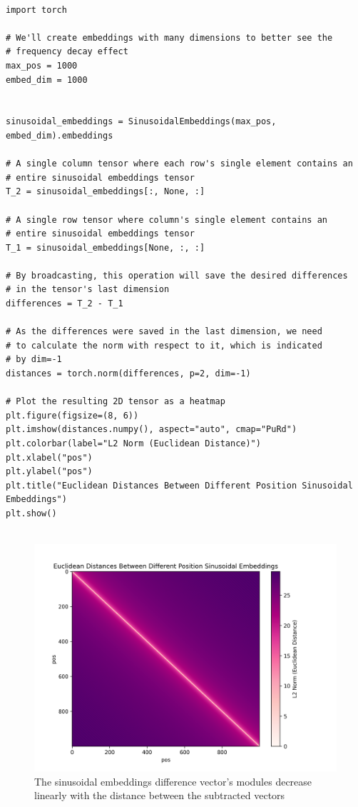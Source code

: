 \documentclass{article}
\begin{document}
\begin{lstlisting}[caption={Generating the plot of the module of the difference between every two different positions sinusoidal embeddings}]
	
import torch

# We'll create embeddings with many dimensions to better see the 
# frequency decay effect
max_pos = 1000
embed_dim = 1000


sinusoidal_embeddings = SinusoidalEmbeddings(max_pos, embed_dim).embeddings

# A single column tensor where each row's single element contains an 
# entire sinusoidal embeddings tensor
T_2 = sinusoidal_embeddings[:, None, :]

# A single row tensor where column's single element contains an 
# entire sinusoidal embeddings tensor
T_1 = sinusoidal_embeddings[None, :, :]

# By broadcasting, this operation will save the desired differences
# in the tensor's last dimension
differences = T_2 - T_1

# As the differences were saved in the last dimension, we need 
# to calculate the norm with respect to it, which is indicated 
# by dim=-1
distances = torch.norm(differences, p=2, dim=-1)

# Plot the resulting 2D tensor as a heatmap
plt.figure(figsize=(8, 6))
plt.imshow(distances.numpy(), aspect="auto", cmap="PuRd")
plt.colorbar(label="L2 Norm (Euclidean Distance)")
plt.xlabel("pos")
plt.ylabel("pos")
plt.title("Euclidean Distances Between Different Position Sinusoidal Embeddings")
plt.show()


\end{lstlisting}

\begin{figure}[h] 
	\centering
	\includegraphics[width=\linewidth]{images/sin_embeds_scale_invariance.png}
	\caption{The sinusoidal embeddings difference vector's modules decrease linearly with the distance between the subtracted vectors}
	\label{fig:sin_embeds_scale_invariance}
\end{figure}
\end{document}
